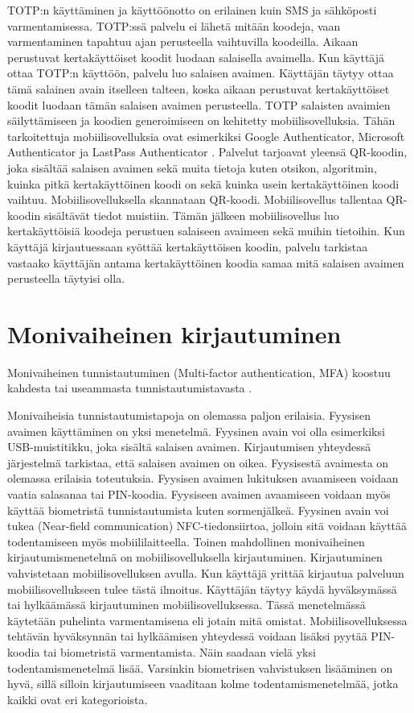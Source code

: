 TOTP:n käyttäminen ja käyttöönotto on erilainen kuin SMS ja sähköposti varmentamisessa. TOTP:ssä palvelu ei lähetä mitään koodeja, vaan varmentaminen tapahtuu ajan perusteella vaihtuvilla koodeilla. Aikaan perustuvat kertakäyttöiset koodit luodaan salaisella avaimella. Kun käyttäjä ottaa TOTP:n käyttöön, palvelu luo salaisen avaimen. Käyttäjän täytyy ottaa tämä salainen avain itselleen talteen, koska aikaan perustuvat kertakäyttöiset koodit luodaan tämän salaisen avaimen perusteella. TOTP salaisten avaimien säilyttämiseen ja koodien generoimiseen on kehitetty mobiilisovelluksia. Tähän tarkoitettuja mobiilisovelluksia ovat esimerkiksi Google Authenticator, Microsoft Authenticator ja LastPass Authenticator \citep{best_authenticator_apps}. Palvelut tarjoavat yleensä QR-koodin, joka sisältää salaisen avaimen sekä muita tietoja kuten otsikon, algoritmin, kuinka pitkä kertakäyttöinen koodi on sekä kuinka usein kertakäyttöinen koodi vaihtuu. Mobiilisovelluksella skannataan QR-koodi. Mobiilisovellus tallentaa QR-koodin sisältävät tiedot muistiin. Tämän jälkeen mobiilisovellus luo kertakäyttöisiä koodeja perustuen salaiseen avaimeen sekä muihin tietoihin. Kun käyttäjä kirjautuessaan syöttää kertakäyttöisen koodin, palvelu tarkistaa vastaako käyttäjän antama kertakäyttöinen koodia samaa mitä salaisen avaimen perusteella täytyisi olla.

\section{Monivaiheinen kirjautuminen}

Monivaiheinen tunnistautuminen (Multi-factor authentication, MFA) koostuu kahdesta tai useammasta tunnistautumistavasta \citep{two_factor_multi_factor_difference}.

Monivaiheisia tunnistautumistapoja on olemassa paljon erilaisia. Fyysisen avaimen käyttäminen on yksi menetelmä. Fyysinen avain voi olla esimerkiksi USB-muistitikku, joka sisältä salaisen avaimen. Kirjautumisen yhteydessä järjestelmä tarkistaa, että salaisen avaimen on oikea. Fyysisestä avaimesta on olemassa erilaisia toteutuksia. Fyysisen avaimen lukituksen avaamiseen voidaan vaatia salasanaa tai PIN-koodia. Fyysiseen avaimen avaamiseen voidaan myös käyttää biometristä tunnistautumista kuten sormenjälkeä. Fyysinen avain voi tukea (Near-field communication) NFC-tiedonsiirtoa, jolloin sitä voidaan käyttää todentamiseen myös mobiililaitteella.
Toinen mahdollinen monivaiheinen kirjautumismenetelmä on mobiilisovelluksella kirjautuminen. Kirjautuminen vahvistetaan mobiilisovelluksen avulla. Kun käyttäjä yrittää kirjautua palveluun mobiilisovellukseen tulee tästä ilmoitus. Käyttäjän täytyy käydä hyväksymässä tai hylkäämässä kirjautuminen mobiilisovelluksessa. Tässä menetelmässä käytetään puhelinta varmentamisena eli jotain mitä omistat. Mobiilisovelluksessa tehtävän hyväksynnän tai hylkäämisen yhteydessä voidaan lisäksi pyytää PIN-koodia tai biometristä varmentamista. Näin saadaan vielä yksi todentamismenetelmä lisää. Varsinkin biometrisen vahvistuksen lisääminen on hyvä, sillä silloin kirjautumiseen vaaditaan kolme todentamismenetelmää, jotka kaikki ovat eri kategorioista. 

